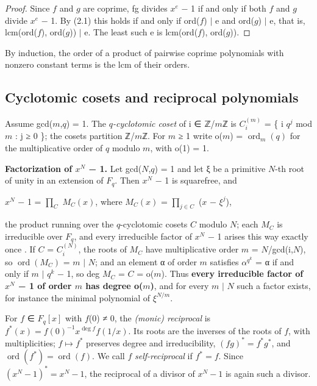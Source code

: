 \documentclass[pdflatex,sn-mathphys-num]{sn-jnl}
\theoremstyle{thmstyleone}
\theoremstyle{thmstylethree}
\begin{document}
\begin{proof}[Proof]

Since \(f\) and \(g\) are coprime, fg divides \(x^e\) − 1 if and only if both \(f\) and \(g\) divide \(x^e\) − 1. By (2.1) this holds if and only if ord(\(f\)) \(\mid\) e and ord(\(g\)) \(\mid\) e, that is, lcm(ord(\(f\)), ord(\(g\))) \(\mid\) e. The least such e is lcm(ord(\(f\)), ord(\(g\))).

\end{proof}

By induction, the order of a product of pairwise coprime polynomials with nonzero constant terms is the lcm of their orders.

\subsection{Cyclotomic cosets and reciprocal polynomials}

Assume gcd(\(m\),\(q\)) = 1. The \emph{\(q\)-cyclotomic coset} of i ∈ ℤ/\(m\)ℤ is \(C_i^{(m)}\) = \{ i \(q^j\) mod \(m\) : j ≥ 0 \}; the cosets partition ℤ/\(m\)ℤ. For \(m\) ≥ 1 write o(\(m\)) = \(\operatorname{ord}_m(q)\) for the multiplicative order of \(q\) modulo \(m\), with o(1) = 1.

\textbf{Factorization of \(x^N\) − 1.} Let gcd(\(N\),\(q\)) = 1 and let ξ be a primitive \(N\)-th root of unity in an extension of \(F_q\). Then \(x^N\) − 1 is squarefree, and

\begin{center}\(x^N\) − 1 = \(∏_{C}\) \(M_C(x)\), where \(M_C(x)\) = \(∏_{j∈C}\) (\(x\) − \(ξ^j\)),\end{center}

the product running over the \(q\)-cyclotomic cosets \(C\) modulo \(N\); each \(M_C\) is irreducible over \(F_q\), and every irreducible factor of \(x^N\) − 1 arises this way exactly once \cite{LN}. If \(C\) = \(C_i^{(N)}\), the roots of \(M_C\) have multiplicative order \(m\) = \(N\)/gcd(i,\(N\)), so \(\operatorname{ord}(M_C)\) = \(m\) \(\mid\) \(N\); and an element α of order \(m\) satisfies \(α^{q^k}\) = α if and only if \(m\) \(\mid\) \(q^k\) − 1, so deg \(M_C\) = \textbar{}\(C\)\textbar{} = o(\(m\)). Thus \textbf{every irreducible factor of \(x^N\) − 1 of order \(m\) has degree o(\(m\))}, and for every \(m\) \(\mid\) \(N\) such a factor exists, for instance the minimal polynomial of \(ξ^{N/m}\).

For \(f\) ∈ \(F_q[x]\) with \(f\)(0) ≠ 0, the \emph{(monic) reciprocal} is \(f^{*}(x)=f(0)^{-1}x^{\deg f}f(1/x)\). Its roots are the inverses of the roots of \(f\), with multiplicities; \(f\mapsto f^{*}\) preserves degree and irreducibility, \((fg)^{*}=f^{*}g^{*}\), and \(\operatorname{ord}(f^{*})=\operatorname{ord}(f)\). We call \(f\) \emph{self-reciprocal} if \(f^{*}=f\). Since \((x^N-1)^{*}=x^N-1\), the reciprocal of a divisor of \(x^N-1\) is again such a divisor.
\end{document}
